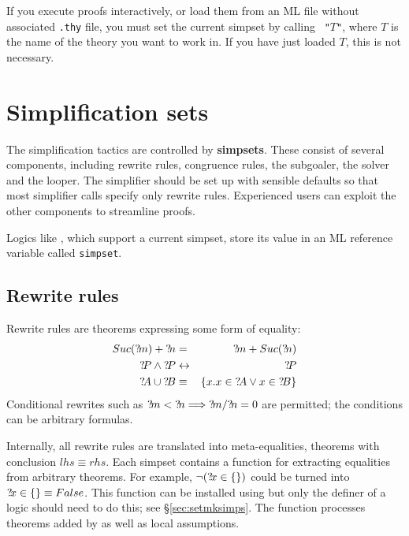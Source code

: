 \begin{warn}
  If you execute proofs interactively, or load them from an ML file without
  associated {\tt .thy} file, you must set the current simpset by calling
  ~{\tt"}$T${\tt"}, where $T$ is the name of the
  theory you want to work in. If you have just loaded $T$, this is not
  necessary.
\end{warn}


\section{Simplification sets} 
The simplification tactics are controlled by {\bf simpsets}.  These
consist of several components, including rewrite rules, congruence
rules, the subgoaler, the solver and the looper.  The simplifier
should be set up with sensible defaults so that most simplifier calls
specify only rewrite rules.  Experienced users can exploit the other
components to streamline proofs.

Logics like \HOL, which support a current
simpset, store its value in an ML reference
variable called {\tt simpset}.

\subsection{Rewrite rules}
Rewrite rules are theorems expressing some form of equality:
\begin{eqnarray*}
  Suc(\Var{m}) + \Var{n} &=&      \Var{m} + Suc(\Var{n}) \\
  \Var{P}\conj\Var{P}    &\bimp&  \Var{P} \\
  \Var{A} \un \Var{B} &\equiv& \{x.x\in \Var{A} \disj x\in \Var{B}\}
\end{eqnarray*}
Conditional rewrites such as ${?\!m}<{?\!n} \Longrightarrow {?\!m}/{?\!n} =
0$ are permitted; the conditions can be arbitrary formulas.

Internally, all rewrite rules are translated into meta-equalities, theorems
with conclusion $lhs \equiv rhs$.  Each simpset contains a function for
extracting equalities from arbitrary theorems.  For example,
$\neg({?\!x}\in \{\})$ could be turned into ${?\!x}\in \{\} \equiv
False$.  This function can be installed using  but only
the definer of a logic should need to do this; see \S\ref{sec:setmksimps}.
The function processes theorems added by  as well as
local assumptions.


